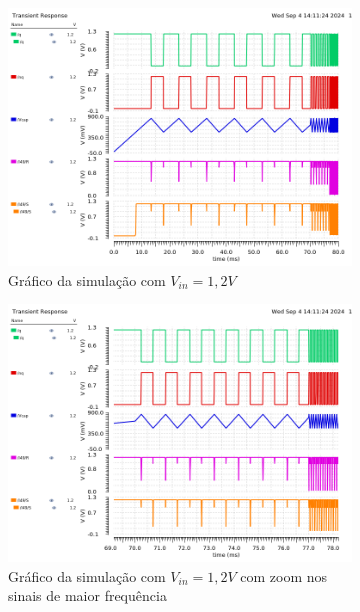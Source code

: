 \begin{figure}[htb]
	\centering
	 \begin{subfigure}[b]{0.49\textwidth}
	  \centering
	  \includegraphics[width=\textwidth]{figuras/imgs_jv/waves_1-2_parte1.png}       
    \caption{Gráfico da simulação com $V_{in}=1,2V$}
    \label{fig20}
   \end{subfigure}
	 \begin{subfigure}[b]{0.49\textwidth}
	  \centering
	  \includegraphics[width=\textwidth]{figuras/imgs_jv/waves_1-2_parte2.png}       
    \caption{Gráfico da simulação com $V_{in}=1,2V$ com zoom nos sinais de maior frequência}
    \label{fig21}
   \end{subfigure}
\hfill 
	 \begin{subfigure}[b]{0.49\textwidth}

\end{subfigure}
\end{figure}
